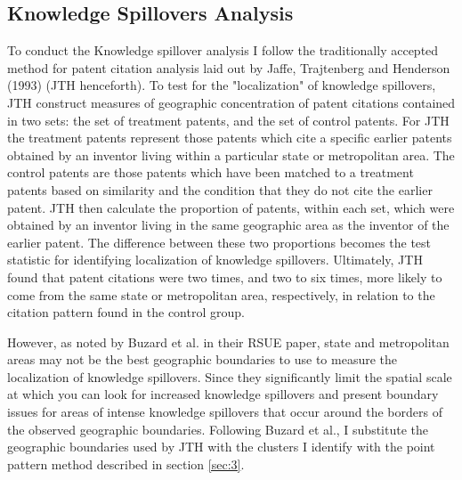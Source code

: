 \documentclass[12pt,letterpaper]{article}
\begin{document}
\subsection{Knowledge Spillovers Analysis}
To conduct the Knowledge spillover analysis I follow the traditionally accepted method for patent citation analysis laid out by Jaffe, Trajtenberg and Henderson (1993) (JTH henceforth). To test for the "localization" of knowledge spillovers, JTH construct measures of geographic concentration of patent citations contained in two sets: the set of treatment patents, and the set of control patents. For JTH the treatment patents represent those patents which cite a specific earlier patents obtained by an inventor living within a particular state or metropolitan area. The control patents are those patents which have been matched to a treatment patents based on similarity and the condition that they do not cite the earlier patent. JTH then calculate the proportion of patents, within each set, which were obtained by an inventor living in the same geographic area as the inventor of the earlier patent. The difference between these two proportions becomes the test statistic for identifying localization of knowledge spillovers. Ultimately, JTH found that patent citations were two times, and two to six times, more likely to come from the same state or metropolitan area, respectively, in relation to the citation pattern found in the control group. 
\par 
However, as noted by Buzard et al. in their RSUE paper, state and metropolitan areas may not be the best geographic boundaries to use to measure the localization of knowledge spillovers. Since they significantly limit the spatial scale at which you can look for increased knowledge spillovers and present boundary issues for areas of intense knowledge spillovers that occur around the borders of the observed geographic boundaries. Following Buzard et al., I substitute the geographic boundaries used by JTH with the clusters I identify with the point pattern method described in section \ref{sec:3}. 
\end{document}
